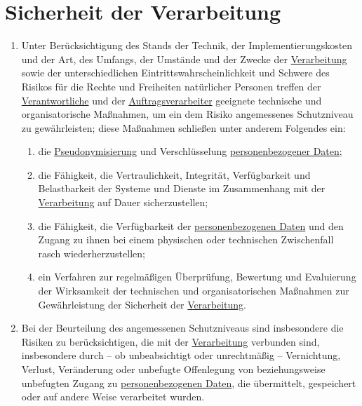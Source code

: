\chapter{Sicherheit der Verarbeitung}
\label{ch:32}


\begin{enumerate}

  \item Unter Berücksichtigung des Stands der Technik, der Implementierungskosten und der Art, des Umfangs, der Umstände
   und der Zwecke der \hyperref[itm:04-2]{Verarbeitung} sowie der unterschiedlichen Eintrittswahrscheinlichkeit und Schwere des Risikos für
   die Rechte und Freiheiten natürlicher Personen treffen der \hyperref[itm:04-7]{Verantwortliche} und der \hyperref[itm:04-8]{Auftragsverarbeiter} geeignete
   technische und organisatorische Maßnahmen, um ein dem Risiko angemessenes Schutzniveau zu gewährleisten; diese
   Maßnahmen schließen unter anderem Folgendes ein:
  \label{itm:32-1}

  \begin{enumerate}
  
    \item die \hyperref[itm:04-5]{Pseudonymisierung} und Verschlüsselung \hyperref[itm:04-1]{personenbezogener Daten};
    \label{itm:32-1a}

    \item die Fähigkeit, die Vertraulichkeit, Integrität, Verfügbarkeit und Belastbarkeit der Systeme und Dienste im
     Zusammenhang mit der \hyperref[itm:04-2]{Verarbeitung} auf Dauer sicherzustellen;
    \label{itm:32-1b}

    \item die Fähigkeit, die Verfügbarkeit der \hyperref[itm:04-1]{personenbezogenen Daten} und den Zugang zu ihnen bei einem physischen oder
     technischen Zwischenfall rasch wiederherzustellen;
    \label{itm:32-1c}

    \item ein Verfahren zur regelmäßigen Überprüfung, Bewertung und Evaluierung der Wirksamkeit der technischen und
     organisatorischen Maßnahmen zur Gewährleistung der Sicherheit der \hyperref[itm:04-2]{Verarbeitung}.
    \label{itm:32-1d}

  \end{enumerate}

  \item Bei der Beurteilung des angemessenen Schutzniveaus sind insbesondere die Risiken zu berücksichtigen, die mit der
   \hyperref[itm:04-2]{Verarbeitung} verbunden sind, insbesondere durch -- ob unbeabsichtigt oder unrechtmäßig -- Vernichtung, Verlust,
   Veränderung oder unbefugte Offenlegung von beziehungsweise unbefugten Zugang zu \hyperref[itm:04-1]{personenbezogenen Daten}, die
   übermittelt, gespeichert oder auf andere Weise verarbeitet wurden.
  \label{itm:32-2}


\end{enumerate}
